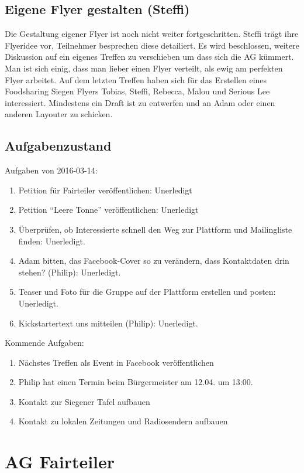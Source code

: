 \documentclass{scrreprt}
\begin{document}
\subsection{Eigene Flyer gestalten (Steffi)} 
Die Gestaltung eigener Flyer ist noch nicht weiter fortgeschritten. Steffi trägt ihre Flyeridee vor, Teilnehmer besprechen diese detailiert. Es wird beschlossen, weitere Diskussion auf ein eigenes Treffen zu verschieben um dass sich die AG kümmert. Man ist sich einig, dass man lieber einen Flyer verteilt, als ewig am perfekten Flyer arbeitet. Auf dem letzten Treffen haben sich für das Erstellen eines Foodsharing Siegen Flyers Tobias, Steffi, Rebecca, Malou und Serious Lee interessiert. Mindestens ein Draft ist zu entwerfen  und an Adam oder einen anderen Layouter zu schicken.

\subsection{Aufgabenzustand}
Aufgaben von 2016-03-14:
	\begin{enumerate}
		\item Petition für Fairteiler veröffentlichen: Unerledigt
		\item Petition \enquote{Leere Tonne} veröffentlichen: Unerledigt
		\item Überprüfen, ob Interessierte schnell den Weg zur Plattform und Mailingliste finden: Unerledigt.
		\item Adam bitten, das Facebook-Cover so zu verändern, dass Kontaktdaten drin stehen? (Philip): Unerledigt. 
		\item Teaser und Foto für die Gruppe auf der Plattform erstellen und posten: Unerledigt.
		\item Kickstartertext uns mitteilen (Philip): Unerledigt.
	\end{enumerate} 
Kommende Aufgaben:
	\begin{enumerate}
		\item Nächstes Treffen als Event in Facebook veröffentlichen
		\item Philip hat einen Termin beim Bürgermeister am 12.04. um 13:00. 
		\item Kontakt zur Siegener Tafel aufbauen
		\item Kontakt zu lokalen Zeitungen und Radiosendern aufbauen
	\end{enumerate}

\section{AG Fairteiler}
\end{document}
